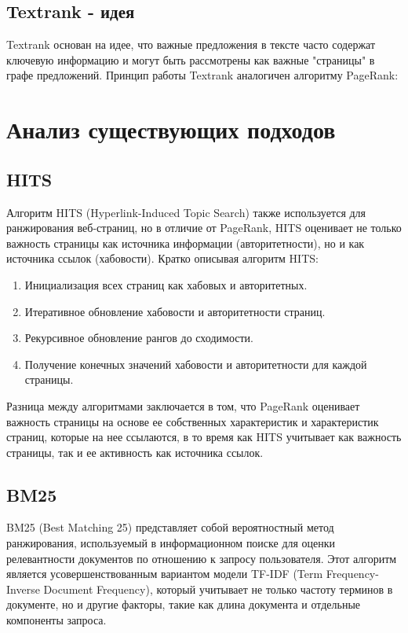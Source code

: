 \documentclass[a4paper]{article}
\begin{document}
\subsection{Textrank - идея}

Textrank основан на идее, что важные предложения в тексте часто содержат ключевую информацию и могут быть рассмотрены как важные "страницы" в графе предложений. Принцип работы Textrank аналогичен алгоритму PageRank:


	\newpage
	\section{Анализ существующих подходов}
	
	\subsection{HITS}
	
Алгоритм HITS (Hyperlink-Induced Topic Search) также используется для ранжирования веб-страниц, но в отличие от PageRank, HITS оценивает не только важность страницы как источника информации (авторитетности), но и как источника ссылок (хабовости). Кратко описывая алгоритм HITS:

\begin{enumerate}
	\item Инициализация всех страниц как хабовых и авторитетных.
	\item Итеративное обновление хабовости и авторитетности страниц.
	\item Рекурсивное обновление рангов до сходимости.
	\item Получение конечных значений хабовости и авторитетности для каждой страницы.
\end{enumerate}

Разница между алгоритмами заключается в том, что PageRank оценивает важность страницы на основе ее собственных характеристик и характеристик страниц, которые на нее ссылаются, в то время как HITS учитывает как важность страницы, так и ее активность как источника ссылок.

	\subsection{BM25}
	
BM25 (Best Matching 25) представляет собой вероятностный метод ранжирования, используемый в информационном поиске для оценки релевантности документов по отношению к запросу пользователя. Этот алгоритм является усовершенствованным вариантом модели TF-IDF (Term Frequency-Inverse Document Frequency), который учитывает не только частоту терминов в документе, но и другие факторы, такие как длина документа и отдельные компоненты запроса.
\end{document}
